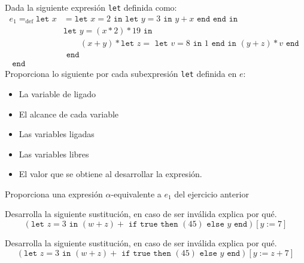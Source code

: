     \begin{exercise}
        Dada la siguiente expresión \texttt{let} definida como:
        \begin{align*}
        	e_1=_{\text{def}}\texttt{let  }
        		x&= \texttt{let }x = 2 \texttt{ in } \texttt{let } y = 3 \texttt{ in } y + x \texttt{ end } \texttt{end}
        		\texttt{ in }\\
        		 &\texttt{let }y=(x \ast 2) \ast 19 
        		 	\texttt{ in } \\
        		 & \qquad(x + y) \ast \texttt{let } z = \texttt{ let } v = 8 \texttt{ in } 1 \texttt{ end} \texttt{ in } 
        		 						(y + z) \ast v 
        		 				\texttt{ end }\\
        		 &\texttt{ end }\\
        	\texttt{ end }&
        \end{align*}
        Proporciona lo siguiente por cada subexpresión \texttt{let} definida en $e$:
        \begin{itemize}
	 \item La variable de ligado
            \item El alcance de cada variable
            \item Las variables ligadas
	 \item Las variables libres
            \item El valor que se obtiene al desarrollar la expresión.
        \end{itemize}
    \end{exercise}

\bigskip
    
    \begin{exercise}
        Proporciona una expresión $\alpha$-equivalente a $e_1$ del ejercicio anterior 
    \end{exercise}

    \bigskip
    
    
    \begin{exercise}
         Desarrolla la siguiente sustitución, en caso de ser inválida explica por qué.
         \[
        (\texttt{let } z = 3 \texttt{ in } (w + z) + \texttt{ if} \texttt{ true} \texttt{ then } (45) \texttt{ else } y \texttt{ end}) [y:=7]
         \]
    \end{exercise}

    \bigskip
    
    \begin{exercise}
        Desarrolla la siguiente sustitución, en caso de ser inválida explica por qué. 
        \[
            (\texttt{let } z = 3 \texttt{ in } (w + z) + \texttt{ if} \texttt{ true} \texttt{ then } (45) \texttt{ else } y  \texttt{ end}) [y:=z+7]
        \]
    \end{exercise}

